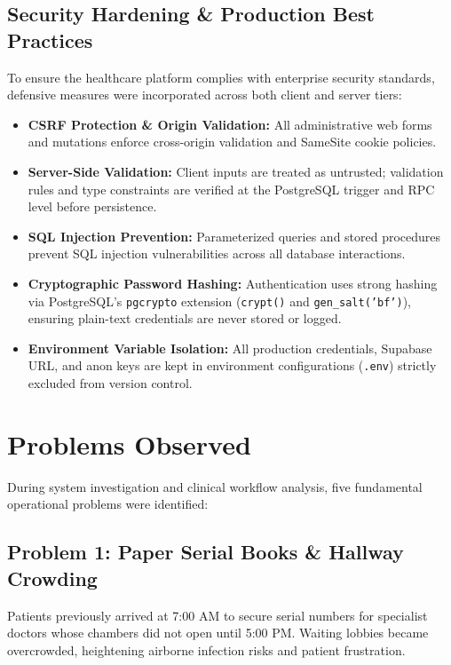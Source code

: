 \documentclass[11pt,a4paper,oneside]{report}
\begin{document}
\section{Security Hardening \& Production Best Practices}
To ensure the healthcare platform complies with enterprise security standards, defensive measures were incorporated across both client and server tiers:
\begin{itemize}
    \item \textbf{CSRF Protection \& Origin Validation:} All administrative web forms and mutations enforce cross-origin validation and SameSite cookie policies.
    \item \textbf{Server-Side Validation:} Client inputs are treated as untrusted; validation rules and type constraints are verified at the PostgreSQL trigger and RPC level before persistence.
    \item \textbf{SQL Injection Prevention:} Parameterized queries and stored procedures prevent SQL injection vulnerabilities across all database interactions.
    \item \textbf{Cryptographic Password Hashing:} Authentication uses strong hashing via PostgreSQL's \texttt{pgcrypto} extension (\texttt{crypt()} and \texttt{gen\_salt('bf')}), ensuring plain-text credentials are never stored or logged.
    \item \textbf{Environment Variable Isolation:} All production credentials, Supabase URL, and anon keys are kept in environment configurations (\texttt{.env}) strictly excluded from version control.
\end{itemize}

\chapter{Problems Observed}

During system investigation and clinical workflow analysis, five fundamental operational problems were identified:

\section{Problem 1: Paper Serial Books \& Hallway Crowding}
Patients previously arrived at 7:00 AM to secure serial numbers for specialist doctors whose chambers did not open until 5:00 PM. Waiting lobbies became overcrowded, heightening airborne infection risks and patient frustration.
\end{document}
